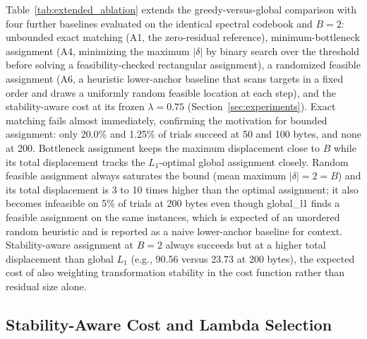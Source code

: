 \documentclass[preprint,12pt]{elsarticle}
\theoremstyle{plain}
\begin{document}
Table~\ref{tab:extended_ablation} extends the greedy-versus-global comparison
with four further baselines evaluated on the identical spectral codebook and
$B=2$: unbounded exact matching (A1, the zero-residual reference), minimum-bottleneck
assignment (A4, minimizing the maximum $|\delta|$ by binary search over the
threshold before solving a feasibility-checked rectangular assignment), a
randomized feasible assignment (A6, a heuristic lower-anchor baseline that
scans targets in a fixed order and draws a uniformly random feasible location
at each step), and the stability-aware cost at its frozen $\lambda=0.75$
(Section~\ref{sec:experiments}). Exact matching fails almost immediately, confirming the
motivation for bounded assignment: only 20.0\% and 1.25\% of trials succeed at
50 and 100 bytes, and none at 200. Bottleneck assignment keeps the maximum
displacement close to $B$ while its total displacement tracks the $L_1$-optimal
global assignment closely. Random feasible assignment always saturates the
bound (mean maximum $|\delta|=2=B$) and its total displacement is 3 to 10
times higher than the optimal assignment; it also becomes infeasible on 5\% of
trials at 200 bytes even though global\_l1 finds a feasible assignment on the
same instances, which is expected of an unordered random heuristic and is
reported as a naive lower-anchor baseline for context.
Stability-aware assignment at $B=2$ always succeeds but at a higher total
displacement than global $L_1$ (e.g., 90.56 versus 23.73 at 200 bytes), the
expected cost of also weighting transformation stability in the cost
function rather than residual size alone.

\begin{table}[!t]
\centering
\caption{Extended Assignment Ablation at $B=2$}
\label{tab:extended_ablation}
\resizebox{\linewidth}{!}{}
\end{table}

\subsection{Stability-Aware Cost and Lambda Selection}
\end{document}
